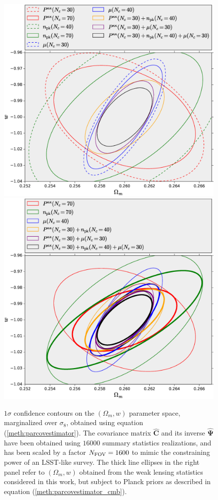 \documentclass[reprint,aps,prd,superscriptaddress,showkeys,showpacs]{revtex4-1}
\newcommand{\bbh}[1]{\mathbf{\hat{#1}}}
\begin{document}
\begin{figure}
\includegraphics[scale=0.3]{Figures/constraints_Om-w_lensing.eps}
\includegraphics[scale=0.3]{Figures/constraints_Om-w_lensing_cmb.eps}
\caption{$1\sigma$ confidence contours on the $(\Omega_m,w)$ parameter space, marginalized over $\sigma_8$, obtained using equation (\ref{meth:parcovestimator}). The covariance matrix $\bbh{C}$ and its inverse $\bbh{\Psi}$ have been obtained using $16000$ summary statistics realizations, and has been scaled by a factor $N_{\rm FOV}=1600$ to mimic the constraining power of an LSST-like survey. The thick line ellipses in the right panel refer to $(\Omega_m,w)$ obtained from the weak lensing statistics considered in this work, but subject to Planck priors as described in equation (\ref{meth:parcovestimator_cmb}).}
\label{fig:constraintsOm-w}
\end{figure}
\end{document}
